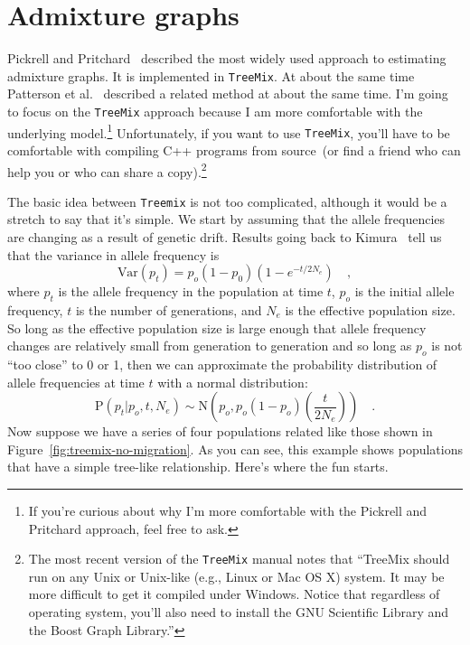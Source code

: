 \documentclass[12pt]{article}
\begin{document}
\section*{Admixture graphs}

Pickrell and Pritchard~\cite{Pickrell-Pritchard-2012} described the
most widely used approach to estimating admixture graphs. It is
implemented in {\tt TreeMix}. At about the same time
Patterson et al.~\cite{Patterson-etal-2012} described a related method
at about the same time. I'm going to focus on the {\tt TreeMix}
approach because I am more comfortable with the underlying
model.\footnote{If you're curious about why I'm more comfortable with
  the Pickrell and Pritchard approach, feel free to ask.}
Unfortunately, if you want to use {\tt TreeMix}, you'll have to be comfortable
with compiling C++ programs from source~(or find a friend who can help
you or who can share a copy).\footnote{The most recent version of the
  {\tt TreeMix} manual notes that ``TreeMix should run on any Unix or
  Unix-like (e.g., Linux or Mac OS X) system. It may be more difficult
  to get it compiled under Windows. Notice that regardless of
  operating system, you'll also need to install the GNU Scientific
  Library and the Boost Graph Library.''}

The basic idea between {\tt Treemix} is not too complicated, although
it would be a stretch to say that it's simple. We start by assuming
that the allele frequencies are changing as a result of genetic
drift. Results going back to Kimura~\cite{Kimura-1955} tell us that
the variance in allele frequency is
\[
  \mbox{Var}(p_t) = p_o(1-p_0)\left(1 - e^{-t/2N_e}\right) \quad ,
\]
where $p_t$ is the allele frequency in the population at time $t$,
$p_o$ is the initial allele frequency, $t$ is the number of
generations, and $N_e$ is the effective population size. So long as
the effective population size is large enough that allele frequency
changes are relatively small from generation to generation and so long
as $p_o$ is not ``too close'' to 0 or 1, then we can approximate the
probability distribution of allele frequencies at time $t$ with a
normal distribution:
\[
  \mbox{P}(p_t|p_o,t,N_e) \sim \mbox{N}\left(p_o,
    p_o(1-p_o)\left(\frac{t}{2N_e}\right)\right) \quad .
\]
Now suppose we have a series of four populations related like those
shown in Figure~\ref{fig:treemix-no-migration}. As you can see, this
example shows populations that have a simple tree-like
relationship. Here's where the fun starts.
\end{document}
